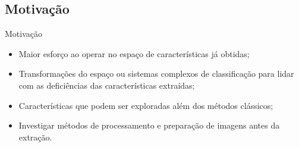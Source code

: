 \documentclass{beamer}
\begin{document}
\subsection{Motivação}
\begin{frame}{Motivação}
  \setlength\leftmargini{1em}
  \justifying
  \begin{itemize}
    \item Maior esforço ao operar no espaço de características já obtidas;
    \item Transformações do espaço ou sistemas complexos de classificação para lidar com as deficiências das características extraídas;
    \item Características que podem ser exploradas além dos métodos clássicos;
    \item Investigar métodos de processamento e preparação de imagens antes da extração.
  \end{itemize}
\end{frame}
\end{document}
